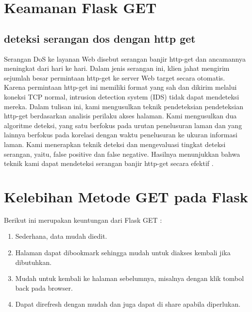 \section{Keamanan Flask GET}
\subsection{deteksi serangan dos dengan http get}
Serangan DoS ke layanan Web disebut serangan banjir http-get dan ancamannya meningkat dari hari ke hari. Dalam jenis serangan ini, klien jahat mengirim sejumlah besar permintaan http-get ke server Web target secara otomatis. Karena permintaan http-get ini memiliki format yang sah dan dikirim melalui koneksi TCP normal, intrusion detection system (IDS) tidak dapat mendeteksi mereka. Dalam tulisan ini, kami mengusulkan teknik pendeteksian pendeteksian http-get berdasarkan analisis perilaku akses halaman. Kami mengusulkan dua algoritme deteksi, yang satu berfokus pada urutan penelusuran laman dan yang lainnya berfokus pada korelasi dengan waktu penelusuran ke ukuran informasi laman. Kami menerapkan teknik deteksi dan mengevaluasi tingkat deteksi serangan, yaitu, false positive dan false negative. Hasilnya menunjukkan bahwa teknik kami dapat mendeteksi serangan banjir http-get secara efektif \cite{yatagai2007detection}.

\section{Kelebihan Metode GET pada Flask}
Berikut ini merupakan keuntungan dari Flask GET \cite{lokhande2015efficient}:
\begin{enumerate}
\item Sederhana, data mudah diedit.
\item Halaman dapat dibookmark sehingga mudah untuk diakses kembali jika dibutuhkan.
\item Mudah untuk kembali ke halaman sebelumnya, misalnya dengan klik tombol back pada browser.
\item Dapat direfresh dengan mudah dan juga dapat di share apabila diperlukan.
\end{enumerate}
